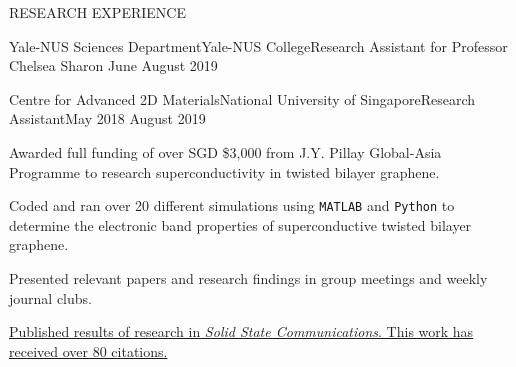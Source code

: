 \documentclass{resume} %
\begin{document}
\begin{rSection}{RESEARCH EXPERIENCE}
\begin{rSubsection}{Yale-NUS Sciences Department}{Yale-NUS College}{Research Assistant for Professor Chelsea Sharon}{  June  {\textendash} August 2019}
\end{rSubsection}

\begin{rSubsection}{Centre for Advanced 2D Materials}{National University of Singapore}{Research Assistant}{May 2018 {\textendash} August 2019}
\item Awarded full funding of over SGD \$3,000 from J.Y. Pillay Global-Asia Programme to research superconductivity in twisted bilayer graphene.
\item Coded and ran over 20 different simulations using \texttt{MATLAB} and \texttt{Python} to determine the electronic band properties of superconductive twisted bilayer graphene.
\item Presented relevant papers and research findings in group meetings and weekly journal clubs.
\item \href{https://doi.org/10.1016/j.ssc.2018.07.013} {Published results of research in \textit{Solid State Communications}. This work has received over 80 citations.}
\end{rSubsection}







\end{rSection}
\end{document}

